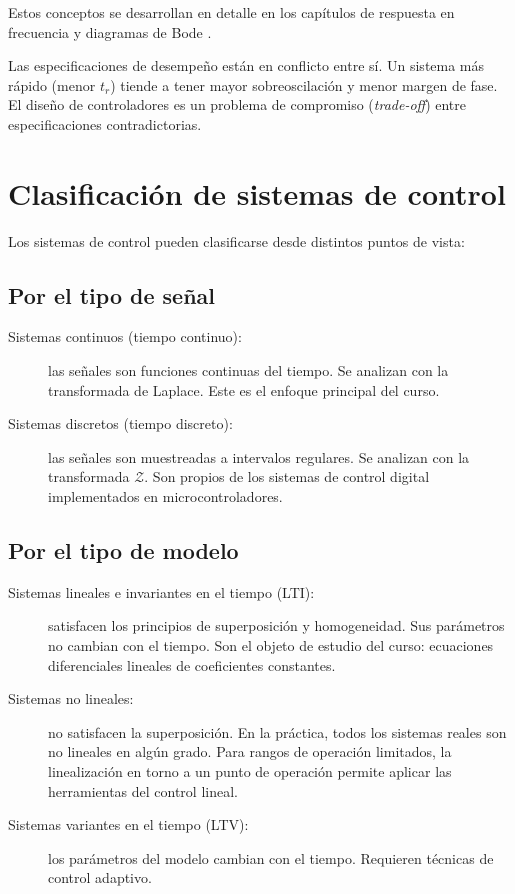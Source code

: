 Estos conceptos se desarrollan en detalle en los capítulos de respuesta en
frecuencia  y diagramas de Bode .

\begin{nota}
  Las especificaciones de desempeño están en conflicto entre sí.
  Un sistema más rápido (menor $t_r$) tiende a tener mayor sobreoscilación
  y menor margen de fase. El diseño de controladores es un problema de
  compromiso (\textit{trade-off}) entre especificaciones contradictorias.
\end{nota}

\section{Clasificación de sistemas de control}
\label{sec:intro-clasificacion}

Los sistemas de control pueden clasificarse desde distintos puntos de vista:

\subsection{Por el tipo de señal}

\begin{description}
  \item[Sistemas continuos (tiempo continuo):] las señales son funciones
    continuas del tiempo. Se analizan con la transformada de Laplace.
    Este es el enfoque principal del curso.
  \item[Sistemas discretos (tiempo discreto):] las señales son muestreadas
    a intervalos regulares. Se analizan con la transformada $\mathcal{Z}$.
    Son propios de los sistemas de control digital implementados en microcontroladores.
\end{description}

\subsection{Por el tipo de modelo}

\begin{description}
  \item[Sistemas lineales e invariantes en el tiempo (LTI):] satisfacen los
    principios de superposición y homogeneidad. Sus parámetros no cambian con
    el tiempo. Son el objeto de estudio del curso: ecuaciones diferenciales
    lineales de coeficientes constantes.
  \item[Sistemas no lineales:] no satisfacen la superposición. En la práctica,
    todos los sistemas reales son no lineales en algún grado. Para rangos de
    operación limitados, la linealización en torno a un punto de operación
    permite aplicar las herramientas del control lineal.
  \item[Sistemas variantes en el tiempo (LTV):] los parámetros del modelo
    cambian con el tiempo. Requieren técnicas de control adaptivo.
\end{description}


